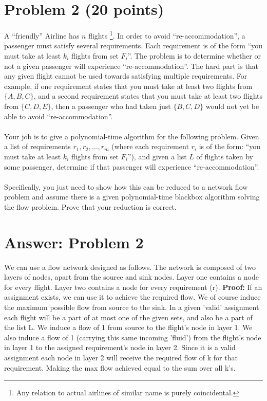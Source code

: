 \documentclass[letterpaper, 11pt]{article}
\begin{document}
\section*{Problem 2 (20 points)}
A ``friendly'' Airline has $n$ flights \footnote{Any relation to actual airlines of similar name is purely coincidental.}. In order to avoid ``re-accommodation'', a passenger must satisfy several requirements. Each requirement is of the form ``you must take at least $k_i$ flights from set $F_i$''. The problem is to determine whether or not a given passenger will experience ``re-accommodation''. The hard part is that any given flight cannot be used towards satisfying multiple requirements. For example, if one requirement states that you must take at least two flights from $\{A,B,C\}$, and a second requirement states that you must take at least two flights from $\{C,D,E\}$, then a passenger who had taken just $\{B,C,D\}$ would not yet be able to avoid ``re-accommodation''.\\\\
Your job is to give a polynomial-time algorithm for the following problem. Given a list of requirements $r_1,r_2,\dots,r_m$ (where each requirement $r_i$ is of the form: ``you must take at least $k_i$ flights from set $F_i$''), and given a list $L$ of flights taken by some passenger, determine if that passenger will experience ``re-accommodation''. \\\\
Specifically, you just need to show how this can be reduced to a network flow problem and assume there is a given polynomial-time blackbox algorithm solving the flow problem. Prove that your reduction is correct.

\newpage
\section*{Answer: Problem 2}
We can use a flow network designed as follows. The network is composed of two layers of nodes, apart from the source and sink nodes. Layer one contains a node for every flight. Layer two contains a node for every requirement (r).
\newline
\newline \textbf{Proof:}
	If an assignment exists, we can use it to achieve the required flow. We of course induce the maximum possible flow from source to the sink. In a given 'valid' assignment each flight will be a part of at most one of the given sets, and also be a part of the list L. We induce a flow of 1 from source to the flight's node in layer 1. We also induce a flow of 1 (carrying this same incoming 'fluid') from the flight's node in layer 1 to the assigned requirement's node in layer 2. Since it is a valid assignment each node in layer 2 will receive the required flow of k for that requirement. Making the max flow achieved equal to the sum over all k's.
\end{document}
